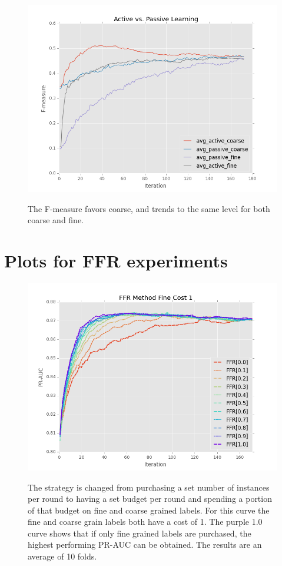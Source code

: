 \documentclass[ms]{nuthesis}
\begin{document}
\FloatBarrier
\begin{figure}[!htb]
	\centering
    \includegraphics[width=1.0\columnwidth]{fig/ActiveVsPassiveF1SVM}
    \label{fig:ActiveVsPassiveF1SVM}
    \caption{The F-measure favors coarse, and trends to the same level
    for both coarse and fine.}
\end{figure}
\FloatBarrier


\break

\FloatBarrier
\section{Plots for FFR experiments}
\begin{figure}[!htb]
	\centering
    \includegraphics[width=1.0\columnwidth]{fig/FFR_PR_Cost1_rnds0_171}
    \label{fig:FFR_PR_Cost1}
    \caption{The strategy is changed from purchasing a set number of instances
    per round to having a set budget per round and spending a portion of that budget
    on fine and coarse grained labels. For this curve the fine and coarse grain labels
    both have a cost of 1. The purple 1.0 curve shows that if only fine grained labels
    are purchased, the highest performing PR-AUC can be obtained. The results are an
    average of 10 folds.}
\end{figure}
\FloatBarrier
\end{document}
